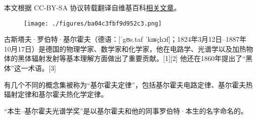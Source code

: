 
本文根据 CC-BY-SA 协议转载翻译自维基百科\href{https://en.wikipedia.org/wiki/Gustav_Kirchhoff}{相关文章}。

\begin{figure}[ht]
\centering
\texttt{[image: ./figures/ba04c3fbf9d952c3.png]}
\caption{} \label{fig_JRHF_1}
\end{figure}
古斯塔夫·罗伯特·基尔霍夫（德语：[ˈgʊs.taf ˈkɪʁçhɔf]；1824年3月12日–1887年10月17日）是德国的物理学家、数学家和化学家，他在电路学、光谱学以及加热物体的黑体辐射发射等基本理解方面做出了重要贡献。[1][2] 他还在1860年提出了“黑体”这一术语。[3]

有几个不同的概念集被称为“基尔霍夫定律”，包括基尔霍夫电路定律、基尔霍夫热辐射定律和基尔霍夫热化学定律。

“本生–基尔霍夫光谱学奖”是以基尔霍夫和他的同事罗伯特·本生的名字命名的。